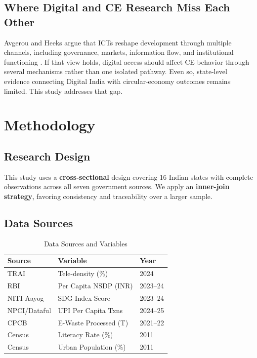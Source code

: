 \documentclass[conference]{IEEEtran}
\begin{document}
\subsection{Where Digital and CE Research Miss Each Other}

Avgerou and Heeks argue that ICTs reshape development through multiple channels, including governance, markets, information flow, and institutional functioning \cite{avgerou2010,heeks2017}. If that view holds, digital access should affect CE behavior through several mechanisms rather than one isolated pathway. Even so, state-level evidence connecting Digital India with circular-economy outcomes remains limited. This study addresses that gap.

\section{Methodology}

\subsection{Research Design}

This study uses a \textbf{cross-sectional} design covering 16 Indian states with complete observations across all seven government sources. We apply an \textbf{inner-join strategy}, favoring consistency and traceability over a larger sample.

\subsection{Data Sources}

\begin{table}[!t]
\centering
\caption{Data Sources and Variables}
\label{tab:data_sources}
\renewcommand{\arraystretch}{1.15}
\begin{tabular}{@{}p{2.2cm}p{2.8cm}p{1.2cm}@{}}
\toprule
\textbf{Source} & \textbf{Variable} & \textbf{Year} \\
\midrule
TRAI \cite{trai2024} & Tele-density (\%) & 2024 \\
RBI \cite{rbi2025} & Per Capita NSDP (INR) & 2023--24 \\
NITI Aayog \cite{nitiSDG2024} & SDG Index Score & 2023--24 \\
NPCI/\newline Dataful \cite{npci2025, dataful2026} & UPI Per Capita Txns & 2024--25 \\
CPCB \cite{cpcb2023} & E-Waste Processed (T) & 2021--22 \\
Census \cite{census2011} & Literacy Rate (\%) & 2011 \\
Census \cite{census2011} & Urban Population (\%) & 2011 \\
\bottomrule
\end{tabular}
\end{table}
\end{document}
